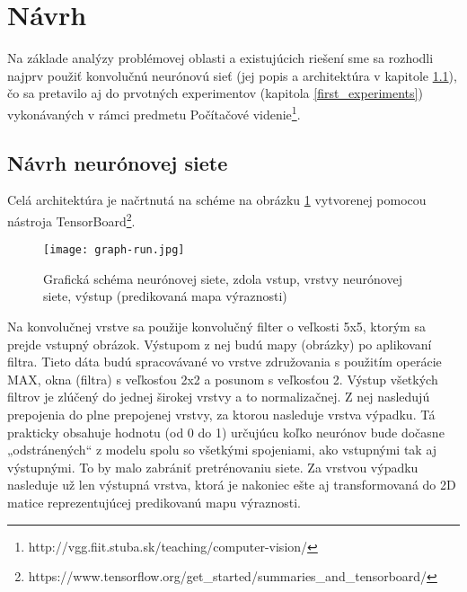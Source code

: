 \newpage

\section{Návrh}

Na základe analýzy problémovej oblasti a existujúcich riešení sme sa rozhodli najprv použiť konvolučnú neurónovú sieť (jej popis a architektúra v kapitole \ref{nn_popis}), čo sa pretavilo aj do prvotných experimentov (kapitola \ref{first_experiments}) vykonávaných v rámci predmetu Počítačové videnie\footnote{http://vgg.fiit.stuba.sk/teaching/computer-vision/}.

\subsection{Návrh neurónovej siete}
\label{nn_popis}
\iffalse
K predikcii pohľadov na webové stránky je vhodné použiť konvolučnú neurónovú sieť, keďže webstránky sú vo forme obrázkov. Neurónová sieť bude predikovať priamo výslednú teplotnú mapu pohľadov (mapu výraznosti). Sieť by mala pozostávať z konvolučnej a združovacej vrstvy (vrstiev) pre spracovanie obrázku, nasledovaných normalizačnou vrstvou, plne prepojenou vrstvou a vrstvou výpadku (z angl. dropout layer). Za nimi nasleduje už len výstupná vrstva. Ako aktivačnú funkciu sme vybrali sigmoid, nakoľko sa bude predikovať mapa výraznosti, t. j. v podstate pravdepodobnosť pohľadu. 
\fi 
Celá architektúra je načrtnutá na schéme na obrázku \ref{my_tensorboard_cnn} vytvorenej pomocou nástroja  TensorBoard\footnote{https://www.tensorflow.org/get\_started/summaries\_and\_tensorboard/}.


\begin{figure}[H]
	\begin{center}\texttt{[image: graph-run.jpg]}
		\caption[Návrh neurónovej siete]{
			Grafická schéma neurónovej siete, zdola vstup, vrstvy neurónovej siete, výstup (predikovaná mapa výraznosti)
		}\label{my_tensorboard_cnn}
	\end{center}
\end{figure}
\iffalse
Na konvolučnej vrstve sa použije konvolučný filter o veľkosti 5x5, ktorým sa prejde vstupný obrázok. Výstupom z nej budú mapy (obrázky) po aplikovaní filtra. Tieto dáta budú spracovávané vo vrstve združovania s použitím operácie MAX, okna (filtra) s veľkosťou 2x2 a posunom s veľkosťou 2. Výstup všetkých filtrov je zlúčený do jednej širokej vrstvy a to normalizačnej. Z nej nasledujú prepojenia do plne prepojenej vrstvy, za ktorou nasleduje vrstva výpadku\cite{dropout}. Tá prakticky obsahuje hodnotu (od 0 do 1) určujúcu koľko neurónov bude dočasne „odstránených“ z modelu spolu so všetkými spojeniami, ako vstupnými tak aj výstupnými. To by malo zabrániť pretrénovaniu siete. Za vrstvou výpadku nasleduje už len výstupná vrstva, ktorá je nakoniec ešte aj transformovaná do 2D matice reprezentujúcej predikovanú mapu výraznosti. 

